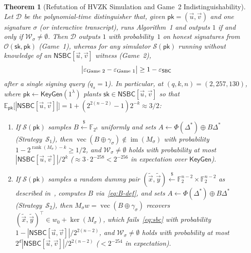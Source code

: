 \documentclass[11pt,a4paper]{article}
\newtheorem{theorem}{Theorem}
\theoremstyle{definition}
\theoremstyle{remark}
\newcommand{\Ftwo}{\mathbb{F}_2}
\newcommand{\Ftwok}{\mathbb{F}_{2^k}}
\newcommand{\SBC}{\mathsf{SBC}}
\newcommand{\NSBC}{\mathsf{NSBC}}
\newcommand{\pk}{\mathsf{pk}}
\newcommand{\sk}{\mathsf{sk}}
\newcommand{\rank}{\operatorname{rank}}
\newcommand{\vecF}{\operatorname{vec}}
\begin{document}
\begin{theorem}[Refutation of HVZK Simulation and Game~2 Indistinguishability]
\label{prop:hvzk-refuted}
Let $\mathcal{D}$ be the polynomial-time distinguisher that, given $\pk = (\vec{u}, \vec{v})$ and one signature $\sigma$ (or interactive transcript), runs Algorithm~1 and outputs $1$ if and only if $\mathcal{W}_\sigma \neq \emptyset$. Then $\mathcal{D}$ outputs $1$ with probability~$1$ on honest signatures from $\mathcal{O}(\sk, \pk)$ (Game~1), whereas for any simulator $\mathcal{S}(\pk)$ running without knowledge of an $\NSBC[\vec{u}, \vec{v}]$ witness (Game~2),
\[
\big|\varepsilon_{\textup{Game 2}} - \varepsilon_{\textup{Game 1}}\big| \ge 1 - \varepsilon_{\SBC}
\]
after a single signing query ($q_s = 1$). In particular, at $(q, k, n) = (2, 257, 130)$, where $\pk \leftarrow \mathsf{KeyGen}(1^\lambda)$ plants $\sk \in \NSBC[\vec{u}, \vec{v}]$ so that $\mathbb{E}_{\pk}\big[|\NSBC[\vec{u}, \vec{v}]|\big] = 1 + (2^{2(n-2)} - 1)2^{-k} \approx 3/2$:
\begin{enumerate}[leftmargin=2em]
    \item If $\mathcal{S}(\pk)$ samples $B \xleftarrow{\$} \Ftwok$ uniformly and sets $A \leftarrow \Phi(\Delta^*) \oplus B\Delta^*$ (Strategy~$\mathcal{S}_1$), then $\vecF(B \oplus \gamma_\sigma) \notin \operatorname{im}(M_\sigma)$ with probability $1 - 2^{\rank(M_\sigma) - k} \ge 1/2$, and $\mathcal{W}_\sigma \neq \emptyset$ holds with probability at most $|\NSBC[\vec{u}, \vec{v}]| / 2^k$ ($\approx 3 \cdot 2^{-258} < 2^{-256}$ in expectation over $\mathsf{KeyGen}$).
    \item If $\mathcal{S}(\pk)$ samples a random dummy pair $(\tilde{\vec{x}}, \tilde{\vec{y}}) \xleftarrow{\$} \Ftwo^{n-2} \times \Ftwo^{n-2}$ as described in~\cite[p.~35, full version]{HJ25}, computes $B$ via~\eqref{eq:B-def}, and sets $A \leftarrow \Phi(\Delta^*) \oplus B\Delta^*$ (Strategy~$\mathcal{S}_2$), then $M_\sigma w = \vecF(B \oplus \gamma_\sigma)$ recovers $(\tilde{\vec{x}}, \tilde{\vec{y}})^\top \in w_0 + \ker(M_\sigma)$, which fails~\eqref{eq:sbc} with probability $1 - |\NSBC[\vec{u}, \vec{v}]| / 2^{2(n-2)}$, and $\mathcal{W}_\sigma \neq \emptyset$ holds with probability at most $2^d |\NSBC[\vec{u}, \vec{v}]| / 2^{2(n-2)}$ ($< 2^{-254}$ in expectation).
\end{enumerate}
\end{theorem}
\end{document}
